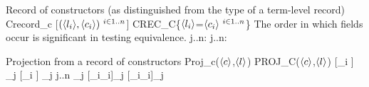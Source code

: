 \documentclass[12pt,twoside,fleqn]{article}
\begin{document}
 {Record of constructors (as distinguished from the type of a
  term-level record)}
 {}
 {Crecord\_c [$(\langle{l_i}\rangle,\langle{c_i}\rangle)\ {}^{i\in 1..n}$]}
 {CREC\_C\{$\langle{l_i}\rangle$=$\langle{c_i}\rangle\ {}^{i\in 1..n}$\}}
 {The order in which fields occur is significant in testing
  equivalence.}
 {\irule
  {\forall j..n:\quad{}}
  {\validconstructor{\context}
       {}
       {}}
 \irule
  {\forall j..n:\quad{}}
  {\equivconstructor{\context}
       {}
       {}
       {}}}

  {Projection from a record of constructors}
  {\cselect{\constructor}{\fieldlabel}}
  {Proj\_c($\langle{c}\rangle$,$\langle{l}\rangle$)}
  {PROJ\_C($\langle{c}\rangle$,$\langle{l}\rangle$)}
  {}
  {\irule
    {\validconstructor{\context}{\constructor}
        {}}
    {
      {[\cvar_i{\mapsto}{}
        ]
       \kind_j}}
   \irule
    {
        {}}
    {\equivconstructor{\context}
      {}
      {}
      {[\cvar_i{\mapsto}{}
        ]
       \kind_j}}
   \irule
    {\validconstructor{\context}
          {}
          {}
     \qquad j..n}
    {\equivconstructor{\context}
       {\cselect
          {}{\fieldlabel_j}}
       {[\cvar_i{\mapsto}{\constructor_i}]{\constructor_j}}
       {[\cvar_i{\mapsto}{\constructor_i}]{\kind_j}}}}
   
\end{document}
